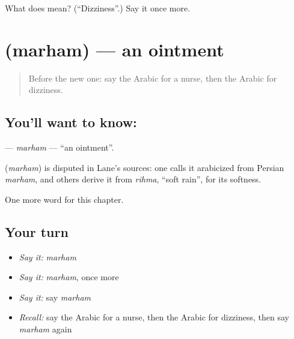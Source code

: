 \begin{tcolorbox}[breakable,colback=teal!4,colframe=teal!35!black,title={Before you move on}]
What does  mean? (\textquotedblleft{}Dizziness\textquotedblright{}.) Say it once more.
\end{tcolorbox}
\section[\texorpdfstring{\ar{مرهم} (marham)}{مرهم (marham)}]{ (marham) — an ointment}

\label{lesson:AR-C232-marham}



\begin{quote}
Before the new one: say the Arabic for a nurse, then the Arabic for dizziness.
\end{quote}

\subsection*{You'll want to know: }
\textbf{} — \emph{marham} — \textquotedblleft{}an ointment\textquotedblright{}.

\begin{cousinweb}
\textbf{} (\emph{marham}) is disputed in Lane's sources: one calls it arabicized from Persian \emph{marham}, and others derive it from \emph{rihma}, \textquotedblleft{}soft rain\textquotedblright{}, for its softness.
\end{cousinweb}

\begin{grammarlens}[title={What you've built}]
One more word for this chapter.
\end{grammarlens}

\subsection*{Your turn}
\begin{itemize}
\raggedright
  \item \emph{Say it:} \emph{marham}
  \item \emph{Say it:} \emph{marham}, once more
  \item \emph{Say it:} say \emph{marham}
  \item \emph{Recall:} say the Arabic for a nurse, then the Arabic for dizziness, then say \emph{marham} again
\end{itemize}

